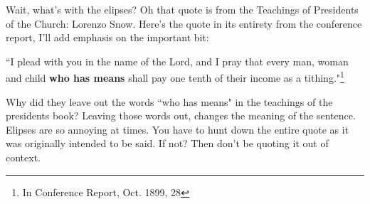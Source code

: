 Wait, what's with the elipses? Oh that quote is from the Teachings of Presidents of
the Church: Lorenzo Snow. Here's the quote in its entirety from the conference
report, I'll add emphasis on the important bit:

\begin{displayquote}
``I plead with you in the name of the Lord, and I pray that every man, woman and child 
\textbf{who has means} shall pay one tenth of their income as a tithing."\footnote{
In Conference Report, Oct. 1899, 28
}
\end{displayquote}

Why did they leave out the words ``who has means" in the teachings of the presidents
book? Leaving those words out, changes the meaning of the sentence. Elipses are so
annoying at times. You have to hunt down the entire quote as it was originally
intended to be said. If not? Then don't be quoting it out of context.